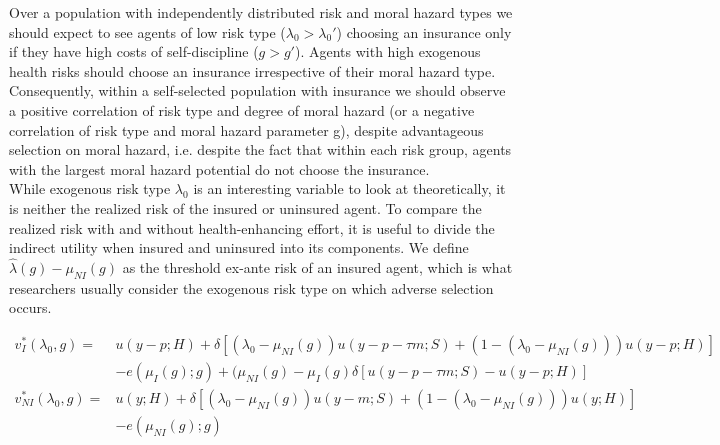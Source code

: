 

Over a population with independently distributed risk and moral hazard types we should expect to see agents of low risk type ($\lambda_0 > \lambda_0'$) choosing an insurance only if they have high costs of self-discipline ($g>g'$).
Agents with high exogenous health risks should choose an insurance irrespective of their moral hazard type. Consequently, within a self-selected population with insurance we should observe a positive correlation of risk type and degree of moral hazard (or a negative correlation of risk type and moral hazard parameter g), despite advantageous selection on moral hazard, i.e. despite the fact that within each risk group, agents with the largest moral hazard potential do not choose the insurance. \\

While exogenous risk type $\lambda_0$ is an interesting variable to look at theoretically, it is neither the realized risk of the insured or uninsured agent. To compare the realized risk with and without health-enhancing effort, it is useful to divide the indirect utility when insured and uninsured into its components. We define $\hat{\lambda}(g)-\mu_{NI}(g)$ as the threshold ex-ante risk of an insured agent, which is what researchers usually consider the exogenous risk type on which adverse selection occurs.

\begin{align*}
	v_I^*(\lambda_0,g)=&u(y-p;H)+\delta\left[ (\lambda_0-\mu_{NI}(g)) u(y-p-\tau m;S)+(1-(\lambda_0-\mu_{NI}(g)))u(y-p;H)\right] \\
	&-e(\mu_I(g);g)+(\mu_{NI}(g)-\mu_I(g)\delta\left[ u(y-p-\tau m;S)-u(y-p;H)\right]  \\
	v_{NI}^*(\lambda_0,g)=&u(y;H)+\delta\left[ (\lambda_0-\mu_{NI}(g)) u(y-m;S)+(1-(\lambda_0-\mu_{NI}(g)))u(y;H)\right] \\
	&-e(\mu_{NI}(g);g)
\end{align*}

